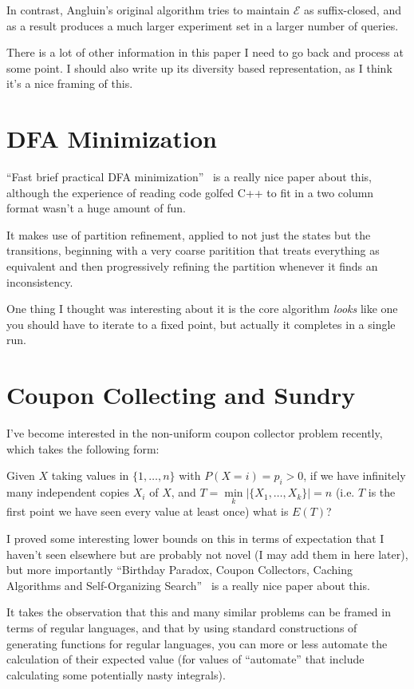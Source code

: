 \documentclass[a4paper]{book}
\begin{document}
In contrast,
Angluin's original algorithm tries to maintain \(\mathcal{E}\) as suffix-closed,
and as a result produces a much larger experiment set in a larger number of queries.

There is a lot of other information in this paper I need to go back and process at some point.
I should also write up its diversity based representation,
as I think it's a nice framing of this.

\section{DFA Minimization}

``Fast brief practical DFA minimization''~\cite{DBLP:journals/ipl/Valmari12} is a really nice paper about this,
although the experience of reading code golfed C++ to fit in a two column format wasn't a huge amount of fun.

It makes use of partition refinement,
applied to not just the states but the transitions,
beginning with a very coarse paritition that treats everything as equivalent and then progressively refining the partition whenever it finds an inconsistency.

One thing I thought was interesting about it is the core algorithm \emph{looks} like one you should have to iterate to a fixed point,
but actually it completes in a single run.

\section{Coupon Collecting and Sundry}\label{sec:coupons}

I've become interested in the non-uniform coupon collector problem recently,
which takes the following form:

Given \(X\) taking values in \(\{1, \ldots, n\}\) with \(P(X = i) = p_i > 0\),
if we have infinitely many independent copies \(X_i\) of \(X\),
and \(T = \min\limits_k |\{X_1, \ldots, X_k\}| = n\) (i.e. \(T\) is the first point we have seen every value at least once)
what is \(E(T)\)?

I proved some interesting lower bounds on this in terms of expectation that I haven't seen elsewhere but are probably not novel (I may add them in here later),
but more importantly ``Birthday Paradox, Coupon Collectors, Caching Algorithms and Self-Organizing Search''~\cite{DBLP:journals/dam/FlajoletGT92} is a really nice paper about this.

It takes the observation that this and many similar problems can be framed in terms of regular languages,
and that by using standard constructions of generating functions for regular languages,
you can more or less automate the calculation of their expected value (for values of ``automate'' that include calculating some potentially nasty integrals).
\end{document}
